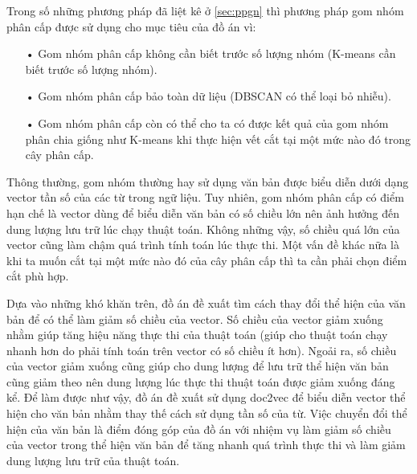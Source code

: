 Trong số những phương pháp đã liệt kê ở \ref{sec:ppgn} thì phương pháp gom nhóm phân cấp được sử dụng cho mục tiêu của đồ án vì:
\begin{enumerate}
\item[•]Gom nhóm phân cấp không cần biết trước số lượng nhóm (K-means cần biết trước số lượng nhóm).
\item[•]Gom nhóm phân cấp bảo toàn dữ liệu (DBSCAN có thể loại bỏ nhiễu).
\item[•]Gom nhóm phân cấp còn có thể cho ta có được kết quả của gom nhóm phân chia giống như K-means khi thực hiện vết cắt tại một mức nào đó trong cây phân cấp.
\end{enumerate}

Thông thường, gom nhóm thường hay sử dụng văn bản được biểu diễn dưới dạng vector tần số của các từ trong ngữ liệu.
Tuy nhiên, gom nhóm phân cấp có điểm hạn chế là vector dùng để biểu diễn văn bản có số chiều lớn nên ảnh hưởng đến dung lượng lưu trữ lúc chạy thuật toán.
Không những vậy, số chiều quá lớn của vector cũng làm chậm quá trình tính toán lúc thực thi.
Một vấn đề khác nữa là khi ta muốn cắt tại một mức nào đó của cây phân cấp thì ta cần phải chọn điểm cắt phù hợp.

Dựa vào những khó khăn trên, đồ án đề xuất tìm cách thay đổi thể hiện của văn bản để có thể làm giảm số chiều của vector.
Số chiều của vector giảm xuống nhằm giúp tăng hiệu năng thực thi của thuật toán (giúp cho thuật toán chạy nhanh hơn do phải tính toán trên vector có số chiều ít hơn).
Ngoải ra, số chiều của vector giảm xuống cũng giúp cho dung lượng để lưu trữ thể hiện văn bản cũng giảm theo nên dung lượng lúc thực thi thuật toán được giảm xuống đáng kể.
Để làm được như vậy, đồ án đề xuất sử dụng doc2vec để biểu diễn vector thể hiện cho văn bản nhằm thay thế cách sử dụng tần số của từ.
Việc chuyển đổi thể hiện của văn bản là điểm đóng góp của đồ án với nhiệm vụ làm giảm số chiều của vector trong thể hiện văn bản để tăng nhanh quá trình thực thi và làm giảm dung lượng lưu trữ của thuật toán.
